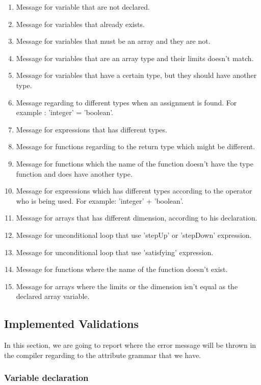 \documentclass[
  oneside,
  11pt, a4paper,
  footinclude=true,
  headinclude=true,
  cleardoublepage=empty
]{scrbook}
\begin{document}
\begin{enumerate}
\item Message for variable that are not declared.
\item Message for variables that already exists.
\item Message for variables that must be an array and they are not.
\item Message for variables that are an array type and their limits doesn't match.
\item Message for variables that have a certain type, but they should have another type. 
\item Message regarding to different types when an assignment is found. For example : 'integer' = 'boolean'. 
\item Message for expressions that has different types.
\item Message for functions regarding to the return type which might be different.
\item Message for functions which the name of the function doesn't have the type function and does have another type.
\item Message for expressions which has different types according to the operator who is being used. For example: 'integer' + 'boolean'. 
\item Message for arrays that has different dimension, according to his declaration.
\item Message for unconditional loop that use 'stepUp' or 'stepDown' expression.
\item Message for unconditional loop that use 'satisfying' expression.
\item Message for functions where the name of the function doesn't exist.
\item Message for arrays where the limits or the dimension isn't equal as the declared array variable.
\end{enumerate}


\subsection{Implemented Validations}

In this section, we are going to report where the error message will be thrown in the compiler regarding to the attribute grammar that we have.

\subsubsection{Variable declaration}
\end{document}
